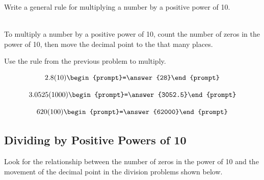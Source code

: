 \documentclass{ximera}
\begin{document}
\begin{question} Write a general rule for multiplying a number by a positive power of 10.

~ \\[1em] 

To multiply a number by a positive power of 10, count the number of zeros in the power of 10, then move the decimal point to the 
 that many places.


\end{question}


\begin{question}  Use the rule from the previous problem to multiply.

\[ 2.8 (10) \begin{prompt}=\answer{28}\end{prompt} \]


\[ 3.0525 (1000) \begin{prompt}=\answer{3052.5}\end{prompt} \]

\[ 620 (100) \begin{prompt}=\answer{62000}\end{prompt} \]

\end{question}

\subsection*{Dividing by Positive Powers of 10}

Look for the relationship between the number of zeros in the power of 10 and the movement of the decimal point in the division problems shown below.
\end{document}
